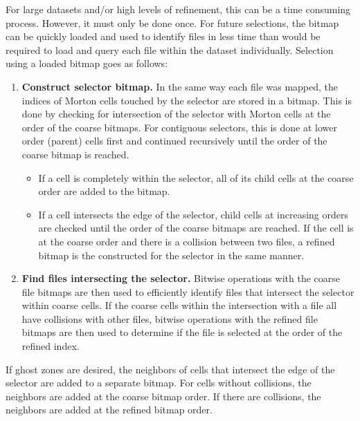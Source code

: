 \documentclass[apjl]{emulateapj}
\begin{document}
For large datasets and/or high levels of refinement, this can be a time consuming process. However, it must only be done once. For future selections, the bitmap can be quickly loaded and used to identify files in less time than would be required to load and query each file within the dataset individually. Selection using a loaded bitmap goes as follows:
\begin{enumerate}
\item {\bf Construct selector bitmap.} In the same way each file was mapped, the indices of Morton cells touched by the selector are stored in a bitmap. This is done by checking for intersection of the selector with Morton cells at the order of the coarse bitmaps. For contiguous selectors, this is done at lower order (parent) cells first and continued recursively until the order of the coarse bitmap is reached. 
\begin{itemize}
\item If a cell is completely within the selector, all of its child cells at the coarse order are added to the bitmap. 
\item If a cell intersects the edge of the selector, child cells at increasing orders are checked until the order of the coarse bitmaps are reached. If the cell is at the coarse order and there is a collision between two files, a refined bitmap is the constructed for the selector in the same manner.
\end{itemize}
\item {\bf Find files intersecting the selector.} Bitwise operations with the coarse file bitmaps are then used to efficiently identify files that intersect the selector within coarse cells. If the coarse cells within the intersection with a file all have collisions with other files, bitwise operations with the refined file bitmaps are then used to determine if the file is selected at the order of the refined index.
\end{enumerate}

If ghost zones are desired, the neighbors of cells that intersect the edge of the selector are added to a separate bitmap. For cells without collisions, the neighbors are added at the coarse bitmap order. If there are collisions, the neighbors are added at the refined bitmap order.

\end{document}
